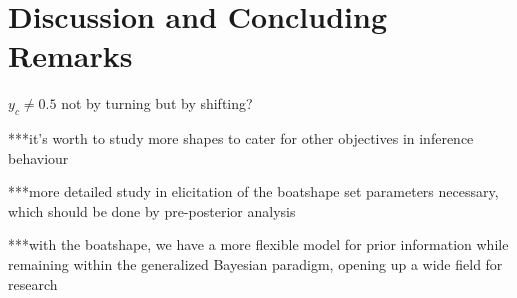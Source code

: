 \documentclass[runningheads,a4paper]{llncs}
\begin{document}
\section{Discussion and Concluding Remarks}
\label{sec:concluding}

$y_c \neq 0.5$ not by turning but by shifting?

***it's worth to study more shapes to cater for other objectives in inference behaviour

***more detailed study in elicitation of the boatshape set parameters necessary,
which should be done by pre-posterior analysis

***with the boatshape, we have a more flexible model for prior information
while remaining within the generalized Bayesian paradigm,
opening up a wide field for research


\printbibliography
\end{document}
